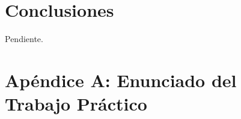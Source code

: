 \documentclass[a4paper,10pt,twoside]{article}
\begin{document}
\section{Conclusiones}
Pendiente.


\newpage

\section{Apéndice A: Enunciado del Trabajo Práctico}

\end{document}
